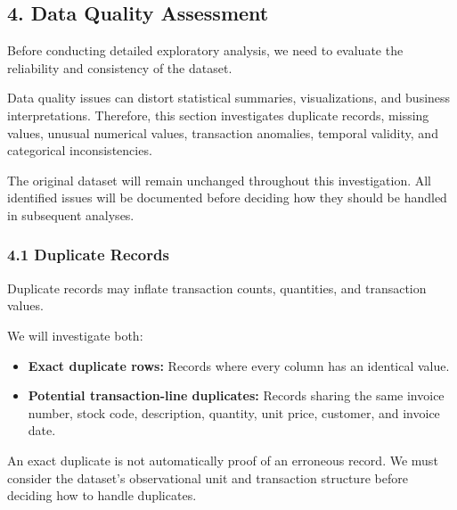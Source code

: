 \documentclass[11pt]{article}
\providecommand{\tightlist}{%
      \setlength{\itemsep}{0pt}\setlength{\parskip}{0pt}}
\begin{document}
    \subsection{4. Data Quality Assessment}\label{data-quality-assessment}

Before conducting detailed exploratory analysis, we need to evaluate the
reliability and consistency of the dataset.

Data quality issues can distort statistical summaries, visualizations,
and business interpretations. Therefore, this section investigates
duplicate records, missing values, unusual numerical values, transaction
anomalies, temporal validity, and categorical inconsistencies.

The original dataset will remain unchanged throughout this
investigation. All identified issues will be documented before deciding
how they should be handled in subsequent analyses.

    \subsubsection{4.1 Duplicate Records}\label{duplicate-records}

Duplicate records may inflate transaction counts, quantities, and
transaction values.

We will investigate both:

\begin{itemize}
\tightlist
\item
  \textbf{Exact duplicate rows:} Records where every column has an
  identical value.
\item
  \textbf{Potential transaction-line duplicates:} Records sharing the
  same invoice number, stock code, description, quantity, unit price,
  customer, and invoice date.
\end{itemize}

An exact duplicate is not automatically proof of an erroneous record. We
must consider the dataset's observational unit and transaction structure
before deciding how to handle duplicates.
\end{document}
